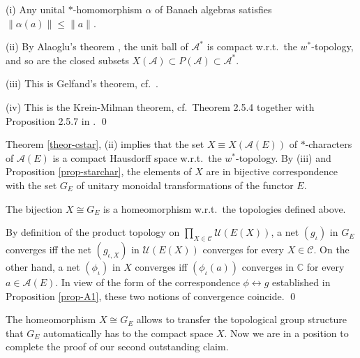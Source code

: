 \documentclass[11pt]{article}
\theoremstyle{definition}
\theoremstyle{definition}
\theoremstyle{remark}
\def\2#1{{\mathcal #1}}
\def\7#1{{\mathbb #1}}
\begin{document}
\prf (i) Any unital $*$-homomorphism $\alpha$ of Banach algebras satisfies $\|\alpha(a)\|\le\|a\|$.

(ii) By Alaoglu's theorem \cite[Theorem 2.5.2]{ped}, the unit ball of $\2A^*$ is compact w.r.t.\ the
$w^*$-topology, and so are the closed subsets $X(\2A)\subset P(\2A)\subset\2A^*$. 

(iii) This is Gelfand's theorem, cf.\ \cite[Theorem 4.3.13]{ped}.

(iv) This is the Krein-Milman theorem, cf.\ Theorem 2.5.4 together with Proposition 2.5.7 in
\cite{ped}. 
\qed

Theorem \ref{theor-cstar}, (ii) implies that the set $X\equiv X(\2A(E))$ of $*$-characters of
$\2A(E)$ is a compact Hausdorff space w.r.t.\ the $w^*$-topology. By (iii) and Proposition
\ref{prop-starchar}, the elements of $X$ are in bijective correspondence with the set $G_E$ of
unitary monoidal transformations of the functor $E$.    

\blemma
The bijection $X\cong G_E$ is a homeomorphism w.r.t.\ the topologies defined above.
\elemma

\prf By definition of the product topology on $\prod_{X\in\2C}\2U(E(X))$, a net $(g_\iota)$ in $G_E$
converges iff the net $(g_{\iota,X})$ in $\2U(E(X))$ converges for every $X\in\2C$. On the other
hand, a net $(\phi_\iota)$ in $X$ converges iff $(\phi_\iota(a))$ converges in $\7C$ for every
$a\in\2A(E)$. In view of the form of the  correspondence $\phi\leftrightarrow g$ established in
Proposition \ref{prop-A1}, these two notions of convergence coincide.
\qed

The homeomorphism $X\cong G_E$ allows to transfer the topological group structure that $G_E$
automatically has to the compact space $X$. Now we are in a position to complete the proof of our
second outstanding claim. \\
\end{document}
